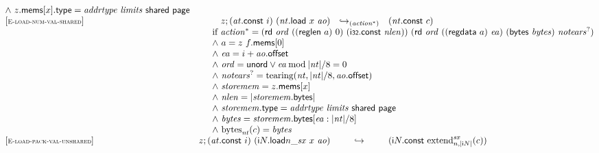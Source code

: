 $$\begin{array}[t]{@{}lrcl@{}l@{}}
{\begin{array}[t]{@{}l@{}}
{\land}~ z{.}\mathsf{mems}{}[x]{.}\mathsf{type} = {\mathit{addrtype}}~{\mathit{limits}}~\mathsf{shared}~\mathsf{page} \\
\end{array}
} \\
{[\textsc{\scriptsize E{-}load{-}num{-}val{-}shared}]} \quad & z ; ({\mathit{at}}{.}\mathsf{const}~i)~({\mathit{nt}}{.}\mathsf{load}~x~{\mathit{ao}}) & {\hookrightarrow}_{({{\mathit{action}}^\ast})} {} & ({\mathit{nt}}{.}\mathsf{const}~c) &  \\
& \multicolumn{4}{@{}l@{}}{\quad
\quad
\begin{array}[t]{@{}l@{}}
\mbox{if}~ {{\mathit{action}}^\ast} = (\mathsf{rd}~{\mathit{ord}}~((\mathsf{reglen}~a)~0)~(\mathsf{i{\scriptstyle 32}}{.}\mathsf{const}~{\mathit{nlen}}))~(\mathsf{rd}~{\mathit{ord}}~((\mathsf{regdata}~a)~{\mathit{ea}})~(\mathsf{bytes}~{\mathit{bytes}})~{{\mathit{notears}}^?}) \\
{\land}~ a = z~f{.}\mathsf{mems}{}[0] \\
{\land}~ {\mathit{ea}} = i + {\mathit{ao}}{.}\mathsf{offset} \\
{\land}~ {\mathit{ord}} = \mathsf{unord} \lor {\mathit{ea}} \mathbin{\mathrm{mod}} {|{\mathit{nt}}|} / 8 = 0 \\
{\land}~ {{\mathit{notears}}^?} = {\mathrm{tearing}}({\mathit{nt}}, {|{\mathit{nt}}|} / 8, {\mathit{ao}}{.}\mathsf{offset}) \\
{\land}~ {\mathit{storemem}} = z{.}\mathsf{mems}{}[x] \\
{\land}~ {\mathit{nlen}} = {|{\mathit{storemem}}{.}\mathsf{bytes}|} \\
{\land}~ {\mathit{storemem}}{.}\mathsf{type} = {\mathit{addrtype}}~{\mathit{limits}}~\mathsf{shared}~\mathsf{page} \\
{\land}~ {\mathit{bytes}} = {\mathit{storemem}}{.}\mathsf{bytes}{}[{\mathit{ea}} : {|{\mathit{nt}}|} / 8] \\
{\land}~ {{\mathrm{bytes}}}_{{\mathit{nt}}}(c) = {\mathit{bytes}} \\
\end{array}
} \\
{[\textsc{\scriptsize E{-}load{-}pack{-}val{-}unshared}]} \quad & z ; ({\mathit{at}}{.}\mathsf{const}~i)~({{\mathsf{i}}{N}{.}\mathsf{load}}{{n}{\mathsf{\_}}{{\mathit{sx}}}}~x~{\mathit{ao}}) & \hookrightarrow & ({\mathsf{i}}{N}{.}\mathsf{const}~{{{{\mathrm{extend}}}_{n, {|{\mathsf{i}}{N}|}}^{{\mathit{sx}}}}}{(c)}) &  \\
& \multicolumn{4}{@{}l@{}}{\quad
\quad
\begin{array}[t]{@{}l@{}}

\end{array}}
\end{array}$$
